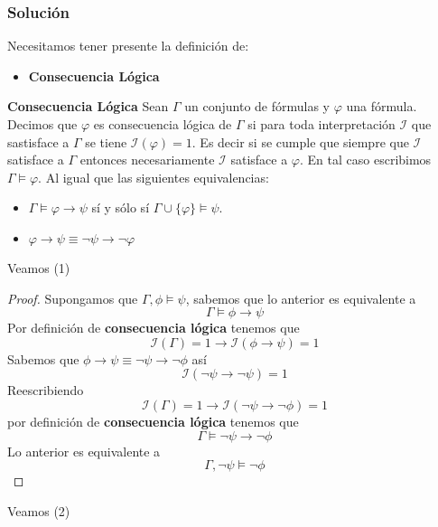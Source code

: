 \documentclass[a4paper]{article}
\begin{document}
\subsubsection{Solución}
Necesitamos tener presente la definición de:
\begin{itemize}
    \item \textbf{Consecuencia Lógica}
\end{itemize}
\textbf{Consecuencia Lógica}
\newline
Sean $\Gamma$ un conjunto de f\'ormulas y $\varphi$ una f\'ormula. Decimos 
que $\varphi$ es consecuencia l\'ogica de $\Gamma$ si para toda interpretaci\'on 
$\mathcal{I}$ que sastisface a $\Gamma$ se tiene $\mathcal{I}(\varphi)=1$. 
Es decir si se cumple que siempre que $\mathcal{I}$ satisface a $\Gamma$ entonces 
necesariamente $\mathcal{I}$ satisface a $\varphi$.
En tal caso escribimos $\Gamma\models\varphi$.
\newline 
Al igual que las siguientes equivalencias:
\begin{itemize}
    \item $\Gamma\models\varphi\to\psi$ sí y sólo sí $\Gamma\cup\{\varphi\}\models\psi$.
    \item \(\varphi \to \psi \equiv \neg \psi \to \neg \varphi \)
\end{itemize}
Veamos (1)
\begin{proof}
    Supongamos que \(\Gamma,\phi\models \psi\), sabemos que lo anterior es equivalente a
    \[
        \Gamma \models \phi \to \psi  
    \]
    Por definición de \textbf{consecuencia lógica} tenemos que
    \[
        \mathcal{I}\left(\Gamma\right) = 1 \to \mathcal{I}\left(\phi \to \psi\right) = 1
    \]
    Sabemos que \(\phi \to \psi \equiv \neg \psi \to \neg \phi\) así
    \[
        \mathcal{I}\left(\neg \psi \to \neg \psi\right) = 1
    \]
    Reescribiendo
    \[
        \mathcal{I}\left(\Gamma\right) = 1 \to \mathcal{I}\left(\neg \psi \to \neg \phi\right) = 1    
    \]
    por definición de \textbf{consecuencia lógica} tenemos que
    \[
        \Gamma \models \neg \psi \to \neg \phi
    \]
    Lo anterior es equivalente a
    \[
        \Gamma, \neg \psi \models \neg \phi
    \]
\end{proof}
Veamos (2)
\end{document}
